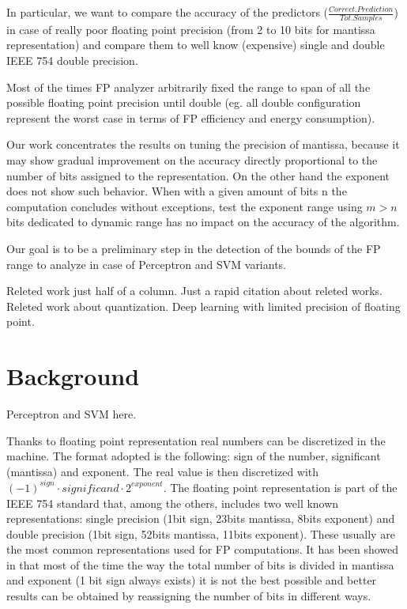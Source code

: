 \documentclass[sigplan,review,anonymous=false]{acmart}\settopmatter{printfolios=true,printccs=false,printacmref=false}
\begin{document}
In particular, we want to compare the accuracy of the predictors ($\frac{Correct.Prediction}{Tot.Samples}$) in case of really poor floating point precision (from 2 to 10 bits for mantissa representation) and compare them to well know (expensive) single and double IEEE 754 double precision. 

Most of the times FP analyzer arbitrarily fixed the range to span of all the possible floating point precision until double (eg. all double configuration represent the worst case in terms of FP efficiency and energy consumption). 

Our work concentrates the results on tuning the precision of mantissa, because it may show gradual improvement on the accuracy directly proportional to the number of bits assigned to the representation. On the other hand the exponent does not show such behavior. When with a given amount of bits n the computation concludes without exceptions, test the exponent range using $m>n$ bits dedicated to dynamic range has no impact on the accuracy of the algorithm. 

Our goal is to be a preliminary step in the detection of the bounds of the FP range to analyze in case of Perceptron and SVM variants. 

Releted work just half of a column.
Just a rapid citation about releted works.
Releted work about quantization.
Deep learning with limited precision of floating point.

\section{Background}
Perceptron and SVM here.

Thanks to floating point representation real numbers can be discretized in the machine. The format adopted is the following: sign of the number, significant (mantissa) and exponent. The real value is then discretized with $(-1)^{sign} \cdot significand \cdot 2^{exponent}$. 
The floating point representation is part of the IEEE 754 standard that, among the others, includes two well known representations: single precision (1bit sign, 23bits mantissa, 8bits exponent) and double precision (1bit sign, 52bits mantissa, 11bits exponent). 
These usually are the most common representations used for FP computations. It has been showed in \cite{softfloat} that most of the time the way the total number of bits is divided in mantissa and exponent (1 bit sign always exists) it is not the best possible and better results can be obtained by reassigning the number of bits in different ways\cite{softfloat}. 
 
\end{document}
